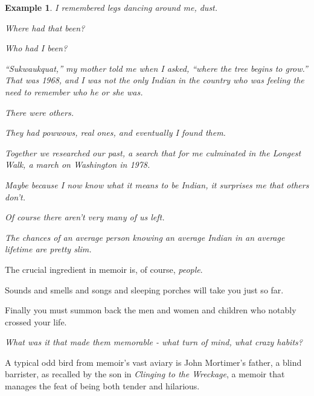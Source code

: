 \documentclass{book}
\numberwithin{equation}{section}
\newtheorem{example}{Example}[chapter]
\begin{document}
\begin{example}
    I remembered legs dancing around me, dust.
    
    \textit{Where had that been?}
    
    \textit{Who had I been?}
    
    ``Sukwaukquat,'' my mother told me when I asked, ``where the tree begins to grow.''
    \\
    
    That was 1968, and I was not the only Indian in the country who was feeling the need to remember who he or she was.
    
    There were others.
    
    They had powwows, real ones, and eventually I found them.
    
    Together we researched our past, a search that for me culminated in the Longest Walk, a march on Washington in 1978.
    
    Maybe because I now know what it means to be Indian, it surprises me that others don't.
    
    Of course there aren't very many of us left.
    
    The chances of an average person knowing an average Indian in an average lifetime are pretty slim.
\end{example}
The crucial ingredient in memoir is, of course, \textit{people}.

Sounds and smells and songs and sleeping porches will take you just so far.

Finally you must summon back the men and women and children who notably crossed your life.

\textit{What was it that made them memorable - what turn of mind, what crazy habits?}

A typical odd bird from memoir's vast aviary is John Mortimer's father, a blind barrister, as recalled by the son in \textit{Clinging to the Wreckage}, a memoir that manages the feat of being both tender and hilarious.
\end{document}
